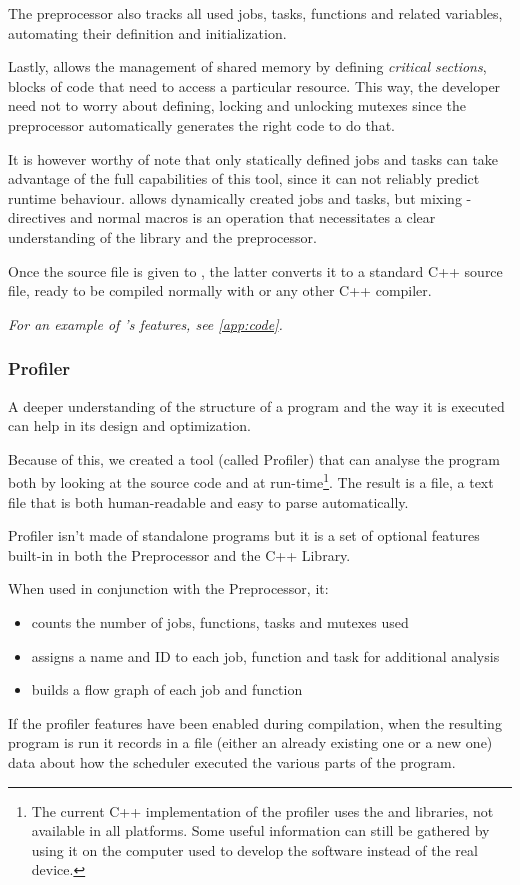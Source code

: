   The preprocessor also tracks all used jobs, tasks, functions and
  related variables, automating their definition and initialization.
  
  Lastly,  allows the management of shared memory
  by defining \textit{critical sections}, blocks of code that need
  to access a particular resource. This way, the developer need not
  to worry about defining, locking and unlocking mutexes since the
  preprocessor automatically generates the right code to do that.
  
  It is however worthy of note that only statically defined jobs and
  tasks can take advantage of the full capabilities of this tool,
  since it can not reliably predict runtime behaviour. \ScheMo{} allows
  dynamically created jobs and tasks, but mixing
  -directives and normal macros is an operation that
  necessitates a clear understanding of the library and the
  preprocessor.
  
  Once the source file is given to , the latter
  converts it to a standard C++ source file, ready to be compiled
  normally with  or any other C++ compiler.
  
  \textit{For an example of \ScheMo{}'s features, see \autoref{app:code}.}
  
\subsubsection{\ScheMo{} Profiler}
\label{sssec:schemoprofile}
  A deeper understanding of the structure of a \ScheMo{} program and the
  way it is executed can help in its design and optimization.

  Because of this, we created a tool (called \ScheMo{} Profiler) that can
  analyse the program both by looking at the source code and at
  run-time\footnote{The current C++ implementation of the profiler uses
  the  and  libraries, not available in all
  platforms. Some useful information can still be gathered by using it
  on the computer used to develop the software instead of the real
  device.}. The result is a  file, a text file that is
  both human-readable and easy to parse automatically.

  \ScheMo{} Profiler isn't made of standalone programs but it is
  a set of optional features built-in in both the \ScheMo{} Preprocessor
  and the \ScheMo{} C++ Library.
  
  \beforelist When used in conjunction with the \ScheMo{} Preprocessor, it:
  \begin{itemize}
    \item counts the number of jobs, functions, tasks and mutexes used
    \item assigns a name and ID to each job, function and task for
      additional analysis
    \item builds a flow graph of each job and function
  \end{itemize}
  \afterlist*
  If the profiler features have been enabled during compilation, when
  the resulting program is run it records in a  file
  (either an already existing one or a new one) data about how
  the scheduler executed the various parts of the program.
  
